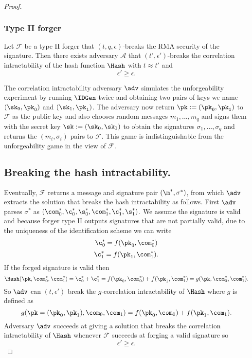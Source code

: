 \begin{proof}
\subsubsection{Type II forger} 
\begin{lemma}
Let $\mathcal{F}$ be a type II forger that $(t,q,\epsilon)$-breaks the RMA security of the signature. Then there exists adversary $\mathcal{A}$ that $(t',\epsilon')$-breaks the correlation intractability of the hash function $\Hash$ with 
$t \approx t'$ and 
$$\epsilon' \geq \epsilon.$$
\end{lemma}

The correlation intractability adversary $\adv$ simulates the unforgeability experiment by
running $\IDGen$ twice and obtaining two pairs of keys we name $(\sk_0,\pk_0)$ and $(\sk_1, \pk_1)$. The adversary now return 
$\pk := (\pk_0, \pk_1)$ to $\mathcal{F}$ as the public key and also
chooses random messages $m_1,...,m_q$ and signs them with the secret key 
$\sk := (\sk_0, \sk_1)$ to obtain the signatures $\sigma_1,...,\sigma_q$ and returns the $(m_i,\sigma_i)$ pairs to $\mathcal{F}$. This game is indistinguishable from the unforgeability game in the view of $\mathcal{F}$.

\subsection*{Breaking the hash intractability.}
Eventually, $\mathcal{F}$ returns a message and signature pair 
 $(\m^*, \sigma^*)$, from which $\adv$ extracts the solution that breaks the hash intractability as follows. First $\adv$ parses $\sigma^*$
as
$(\com^*_{0},\c^*_{0},\s^*_{0}, \com^*_{1}, \c^*_{1},\s^*_{1})$.
We assume the signature is valid and because forger type II outputs signatures that are not partially valid, due to the uniqueness of the identification scheme
 we can write
$$\c^*_0 = f(\pk_0,\com^*_0)$$
$$\c^*_1 = f(\pk_1,\com^*_1).$$
If the forged signature is valid then 
$$\Hash(\pk,\com^*_0,\com^*_1)=\c^*_0+\c^*_1 =  f(\pk_0,\com^*_0)+ f(\pk_1,\com^*_1) = g(\pk,\com^*_0,\com^*_1).$$
So $\adv$ can $(t,\epsilon')$ break the $g$-correlation intractability of $\Hash$ where $g$ is defined as 
$$g(\pk=(\pk_0,\pk_1), \com_0, \com_1) =  f(\pk_0,\com_0)+ f(\pk_1,\com_1).$$
Adversary $\adv$ succeeds at giving a solution that breaks the correlation intractability of $\Hash$ whenever $\mathcal{F}$ succeeds at forging a valid signature so
$$\epsilon'\geq\epsilon.$$

\end{proof}




